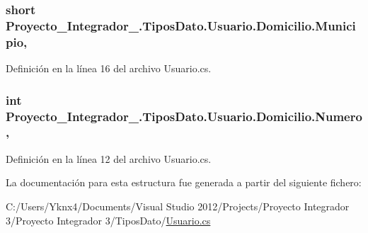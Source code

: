 \hypertarget{struct_proyecto___integrador__3_1_1_tipos_dato_1_1_usuario_1_1_domicilio_a909e9dfc0615a13937e6c4134dca57c5}{
\subsubsection[{Municipio}]{\setlength{\rightskip}{0pt plus 5cm}short Proyecto\-\_\-\-Integrador\-\_.\-Tipos\-Dato.\-Usuario.\-Domicilio.\-Municipio\hspace{0.3cm}{\ttfamily [get]}, {\ttfamily [set]}}}\label{struct_proyecto___integrador__3_1_1_tipos_dato_1_1_usuario_1_1_domicilio_a909e9dfc0615a13937e6c4134dca57c5}


Definición en la línea 16 del archivo Usuario.\-cs.

\hypertarget{struct_proyecto___integrador__3_1_1_tipos_dato_1_1_usuario_1_1_domicilio_a31d02de9239bc44c3da8022fc36419e1}{
\subsubsection[{Numero}]{\setlength{\rightskip}{0pt plus 5cm}int Proyecto\-\_\-\-Integrador\-\_.\-Tipos\-Dato.\-Usuario.\-Domicilio.\-Numero\hspace{0.3cm}{\ttfamily [get]}, {\ttfamily [set]}}}\label{struct_proyecto___integrador__3_1_1_tipos_dato_1_1_usuario_1_1_domicilio_a31d02de9239bc44c3da8022fc36419e1}


Definición en la línea 12 del archivo Usuario.\-cs.



La documentación para esta estructura fue generada a partir del siguiente fichero\-:\begin{DoxyCompactItemize}
\item 
C\-:/\-Users/\-Yknx4/\-Documents/\-Visual Studio 2012/\-Projects/\-Proyecto Integrador 3/\-Proyecto Integrador 3/\-Tipos\-Dato/\hyperlink{_usuario_8cs}{Usuario.\-cs}\end{DoxyCompactItemize}
